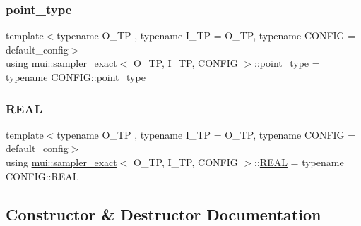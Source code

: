 \mbox{\label{classmui_1_1sampler__exact_a789e8bf4cf1dd6319c67ab7a60458948}} 
\subsubsection{\texorpdfstring{point\+\_\+type}{point\_type}}
{\footnotesize\ttfamily template$<$typename O\+\_\+\+TP , typename I\+\_\+\+TP  = O\+\_\+\+TP, typename C\+O\+N\+F\+IG  = default\+\_\+config$>$ \\
using \hyperlink{classmui_1_1sampler__exact}{mui\+::sampler\+\_\+exact}$<$ O\+\_\+\+TP, I\+\_\+\+TP, C\+O\+N\+F\+IG $>$\+::\hyperlink{classmui_1_1sampler__exact_a789e8bf4cf1dd6319c67ab7a60458948}{point\+\_\+type} =  typename C\+O\+N\+F\+I\+G\+::point\+\_\+type}

\mbox{\label{classmui_1_1sampler__exact_a204186f8735dcdfe021c7e3a36a077bf}} 
\subsubsection{\texorpdfstring{R\+E\+AL}{REAL}}
{\footnotesize\ttfamily template$<$typename O\+\_\+\+TP , typename I\+\_\+\+TP  = O\+\_\+\+TP, typename C\+O\+N\+F\+IG  = default\+\_\+config$>$ \\
using \hyperlink{classmui_1_1sampler__exact}{mui\+::sampler\+\_\+exact}$<$ O\+\_\+\+TP, I\+\_\+\+TP, C\+O\+N\+F\+IG $>$\+::\hyperlink{classmui_1_1sampler__exact_a204186f8735dcdfe021c7e3a36a077bf}{R\+E\+AL} =  typename C\+O\+N\+F\+I\+G\+::\+R\+E\+AL}



\subsection{Constructor \& Destructor Documentation}
\mbox{\label{classmui_1_1sampler__exact_a18387cac7ef30f2b2db31eefee9e02cd}} 

